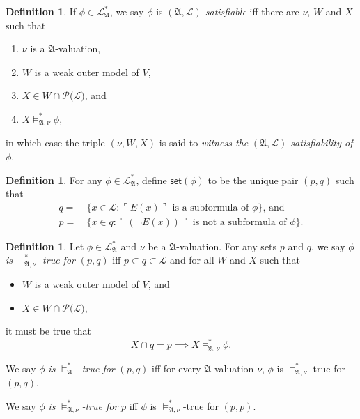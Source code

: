 \documentclass[12pt, twoside]{memoir}
\numberwithin{equation}{section}
\theoremstyle{definition}
\newtheorem{defi}[thm]{Definition}
\theoremstyle{remark}
\theoremstyle{definition}
\theoremstyle{definition}
\theoremstyle{definition}
\theoremstyle{remark}
\begin{document}
\begin{defi}
If $\phi \in \mathcal{L}^{*}_{\mathfrak{A}}$, we say $\phi$ is $(\mathfrak{A}, \mathcal{L})$\emph{-satisfiable} iff there are $\nu$, $W$ and $X$ such that
\begin{enumerate}[label=(\alph*)]
    \item $\nu$ is a $\mathfrak{A}$-valuation,
    \item $W$ is a weak outer model of $V$,
    \item $X \in W \cap \mathcal{P}(\mathcal{L)}$, and
    \item $X \models^*_{\mathfrak{A}, \nu} \phi$,
\end{enumerate}
in which case the triple $(\nu, W, X)$ is said to \emph{witness the} $(\mathfrak{A}, \mathcal{L})$\emph{-satisfiability of} $\phi$.
\end{defi}

\begin{defi}
For any $\phi \in \mathcal{L}^{*}_{\mathfrak{A}}$, define $\mathsf{set}(\phi)$ to be the unique pair $(p, q)$ such that
\begin{align*}
q = \ & \{x \in \mathcal{L} : \ulcorner E(x) \urcorner \text{ is a subformula of } \phi\} \text{, and} \\
p = \ & \{x \in q : \ulcorner (\neg E(x)) \urcorner \text{ is not a subformula of } \phi\} \text{.}
\end{align*}
\end{defi}

\begin{defi}
Let $\phi \in \mathcal{L}^{*}_{\mathfrak{A}}$ and $\nu$ be a $\mathfrak{A}$-valuation. For any sets $p$ and $q$, we say $\phi$ \emph{is} $\models^*_{\mathfrak{A}, \nu}$\emph{-true for} $(p, q)$ iff $p \subset q \subset \mathcal{L}$ and for all $W$ and $X$ such that
\begin{itemize}
    \item $W$ is a weak outer model of $V$, and
    \item $X \in W \cap \mathcal{P}(\mathcal{L)}$, 
\end{itemize}
it must be true that $$X \cap q = p \implies X \models^*_{\mathfrak{A}, \nu} \phi \text{.}$$

We say $\phi$ \emph{is} $\models^*_{\mathfrak{A}}$ \emph{-true for} $(p, q)$ iff for every $\mathfrak{A}$-valuation $\nu$, $\phi$ is $\models^*_{\mathfrak{A}, \nu}$-true for $(p, q)$.

We say $\phi$ \emph{is} $\models^*_{\mathfrak{A}, \nu}$\emph{-true for} $p$ iff $\phi$ is $\models^*_{\mathfrak{A}, \nu}$-true for $(p, p)$.
\end{defi}
\end{document}

